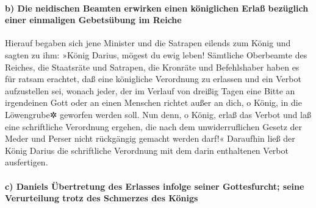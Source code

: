 \hypertarget{b-die-neidischen-beamten-erwirken-einen-kuxf6niglichen-erlauxdf-bezuxfcglich-einer-einmaligen-gebetsuxfcbung-im-reiche}{%
\paragraph{b) Die neidischen Beamten erwirken einen königlichen Erlaß
bezüglich einer einmaligen Gebetsübung im
Reiche}\label{b-die-neidischen-beamten-erwirken-einen-kuxf6niglichen-erlauxdf-bezuxfcglich-einer-einmaligen-gebetsuxfcbung-im-reiche}}

Hierauf begaben sich jene Minister und die Satrapen
eilends zum König und sagten zu ihm: »König Darius, mögest du ewig
leben! Sämtliche Oberbeamte des Reiches, die Staatsräte
und Satrapen, die Kronräte und Befehlshaber haben es für ratsam
erachtet, daß eine königliche Verordnung zu erlassen und ein Verbot
aufzustellen sei, wonach jeder, der im Verlauf von dreißig Tagen eine
Bitte an irgendeinen Gott oder an einen Menschen richtet außer an dich,
o König, in die Löwengrube✲ geworfen werden soll. Nun
denn, o König, erlaß das Verbot und laß eine schriftliche Verordnung
ergehen, die nach dem unwiderruflichen Gesetz der Meder und Perser nicht
rückgängig gemacht werden darf!« Daraufhin ließ der König
Darius die schriftliche Verordnung mit dem darin enthaltenen Verbot
ausfertigen.

\hypertarget{c-daniels-uxfcbertretung-des-erlasses-infolge-seiner-gottesfurcht-seine-verurteilung-trotz-des-schmerzes-des-kuxf6nigs}{%
\paragraph{c) Daniels Übertretung des Erlasses infolge seiner
Gottesfurcht; seine Verurteilung trotz des Schmerzes des
Königs}\label{c-daniels-uxfcbertretung-des-erlasses-infolge-seiner-gottesfurcht-seine-verurteilung-trotz-des-schmerzes-des-kuxf6nigs}}

